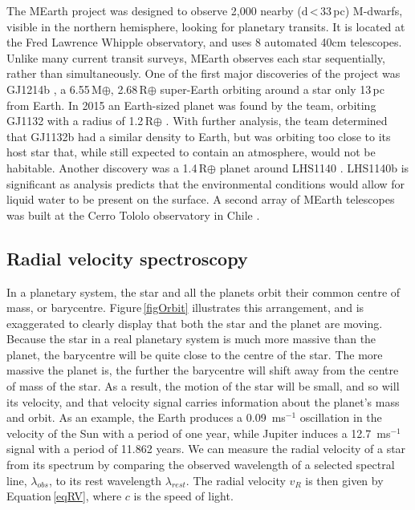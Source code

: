 The MEarth project \citep{2008Nutzman} was designed to observe 2,000 nearby (d\,\textless\,33\,pc) M-dwarfs, visible in the northern hemisphere, looking for planetary transits. It is located at the Fred Lawrence Whipple observatory, and uses 8 automated 40cm telescopes. Unlike many current transit surveys, MEarth observes each star sequentially, rather than simultaneously. One of the first major discoveries of the project was GJ1214b \citep{2009Charbonneau}, a 6.55\,M$\oplus$, 2.68\,R$\oplus$ super-Earth orbiting around a star only 13\,pc from Earth. In 2015 an Earth-sized planet was found by the team, orbiting GJ1132 with a radius of 1.2\,R$\oplus$ \citep{2015BertaThompson}. With further analysis, the team determined that GJ1132b had a similar density to Earth, but was orbiting too close to its host star that, while still expected to contain an atmosphere, would not be habitable. Another discovery was a 1.4\,R$\oplus$ planet around LHS1140 \citep{2017Dittmann}. LHS1140b is significant as analysis predicts that the environmental conditions would allow for liquid water to be present on the surface. A second array of MEarth telescopes was built at the Cerro Tololo observatory in Chile \citep{2014BertaThompson}.

\subsection{Radial velocity spectroscopy}
\label{secRVanalysis}
In a planetary system, the star and all the planets orbit their common centre of mass, or barycentre. Figure\,\ref{figOrbit} illustrates this arrangement, and is exaggerated to clearly display that both the star and the planet are moving. Because the star in a real planetary system is much more massive than the planet, the barycentre will be quite close to the centre of the star. 
The more massive the planet is, the further the barycentre will shift away from the centre of mass of the star. As a result, the motion of the star will be small, and so will its velocity, and that velocity signal carries information about the planet's mass and orbit. As an example, the Earth produces a 0.09~ms$^{-1}$ oscillation in the velocity of the Sun with a period of one year, while Jupiter induces a 12.7~ms$^{-1}$ signal with a period of 11.862 years. We can measure the radial velocity of a star from its spectrum by comparing the observed wavelength of a selected spectral line, $\lambda_{obs}$, to its rest wavelength $\lambda_{rest}$. The radial velocity $v_{R}$ is then given by Equation\,\ref{eqRV}, where $c$ is the speed of light.\\

